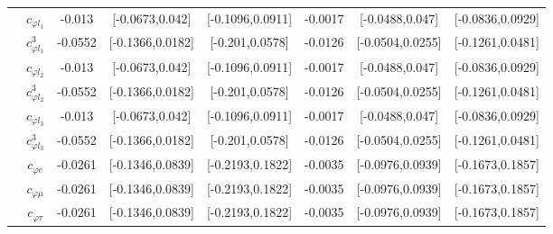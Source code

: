 \documentclass{article}
\begin{document}
\begin{table}[H]
\begin{tabular}{|c|c|c|c|c|c|c|c|}
 & $c_{\varphi l_1}$ & -0.013                             & [-0.0673,0.042]                                 & [-0.1096,0.0911] & -0.0017                             & [-0.0488,0.047]                                 & [-0.0836,0.0929] \\ \cline{2-8}
 & $c_{\varphi l_1}^{3}$ & -0.0552                             & [-0.1366,0.0182]                                 & [-0.201,0.0578] & -0.0126                             & [-0.0504,0.0255]                                 & [-0.1261,0.0481] \\ \cline{2-8}
 & $c_{\varphi l_2}$ & -0.013                             & [-0.0673,0.042]                                 & [-0.1096,0.0911] & -0.0017                             & [-0.0488,0.047]                                 & [-0.0836,0.0929] \\ \cline{2-8}
 & $c_{\varphi l_2}^{3}$ & -0.0552                             & [-0.1366,0.0182]                                 & [-0.201,0.0578] & -0.0126                             & [-0.0504,0.0255]                                 & [-0.1261,0.0481] \\ \cline{2-8}
 & $c_{\varphi l_3}$ & -0.013                             & [-0.0673,0.042]                                 & [-0.1096,0.0911] & -0.0017                             & [-0.0488,0.047]                                 & [-0.0836,0.0929] \\ \cline{2-8}
 & $c_{\varphi l_3}^{3}$ & -0.0552                             & [-0.1366,0.0182]                                 & [-0.201,0.0578] & -0.0126                             & [-0.0504,0.0255]                                 & [-0.1261,0.0481] \\ \cline{2-8}
 & $c_{\varphi e}$ & -0.0261                             & [-0.1346,0.0839]                                 & [-0.2193,0.1822] & -0.0035                             & [-0.0976,0.0939]                                 & [-0.1673,0.1857] \\ \cline{2-8}
 & $c_{\varphi \mu}$ & -0.0261                             & [-0.1346,0.0839]                                 & [-0.2193,0.1822] & -0.0035                             & [-0.0976,0.0939]                                 & [-0.1673,0.1857] \\ \cline{2-8}
 & $c_{\varphi \tau}$ & -0.0261                             & [-0.1346,0.0839]                                 & [-0.2193,0.1822] & -0.0035                             & [-0.0976,0.0939]                                 & [-0.1673,0.1857] \\ \cline{2-8}

\end{tabular}
\end{table}
\end{document}
